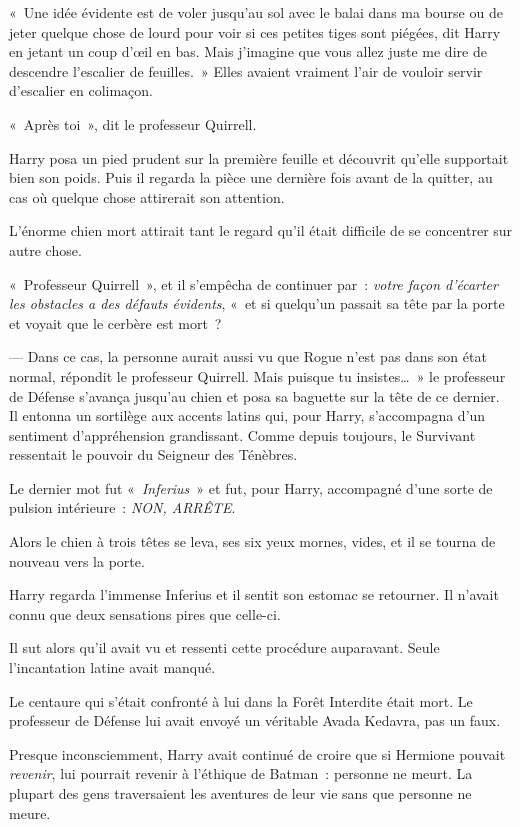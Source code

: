 «~Une idée évidente est de voler jusqu'au sol avec le balai dans ma bourse ou de jeter quelque chose de lourd pour voir si ces petites tiges sont piégées, dit Harry en jetant un coup d'œil en bas.
Mais j'imagine que vous allez juste me dire de descendre l'escalier de feuilles.~»
Elles avaient vraiment l'air de vouloir servir d'escalier en colimaçon.

«~Après toi~», dit le professeur Quirrell.

Harry posa un pied prudent sur la première feuille et découvrit qu'elle supportait bien son poids.
Puis il regarda la pièce une dernière fois avant de la quitter, au cas où quelque chose attirerait son attention.

L'énorme chien mort attirait tant le regard qu'il était difficile de se concentrer sur autre chose.

«~Professeur Quirrell~», et il s'empêcha de continuer par~: \emph{votre façon d'écarter les obstacles a des défauts évidents}, «~et si quelqu'un passait sa tête par la porte et voyait que le cerbère est mort~?

--- Dans ce cas, la personne aurait aussi vu que Rogue n'est pas dans son état normal, répondit le professeur Quirrell.
Mais puisque tu insistes…~»
le professeur de Défense s'avança jusqu'au chien et posa sa baguette sur la tête de ce dernier.
Il entonna un sortilège aux accents latins qui, pour Harry, s'accompagna d'un sentiment d'appréhension grandissant.
Comme depuis toujours, le Survivant ressentait le pouvoir du Seigneur des Ténèbres.

Le dernier mot fut «~\emph{Inferius}~» et fut, pour Harry, accompagné d'une sorte de pulsion intérieure~: \emph{NON, ARRÊTE}.

Alors le chien à trois têtes se leva, ses six yeux mornes, vides, et il se tourna de nouveau vers la porte.

Harry regarda l'immense Inferius et il sentit son estomac se retourner.
Il n'avait connu que deux sensations pires que celle-ci.

Il sut alors qu'il avait vu et ressenti cette procédure auparavant.
Seule l'incantation latine avait manqué.

Le centaure qui s'était confronté à lui dans la Forêt Interdite était mort.
Le professeur de Défense lui avait envoyé un véritable Avada Kedavra, pas un faux.

Presque inconsciemment, Harry avait continué de croire que si Hermione pouvait \emph{revenir}, lui pourrait revenir à l'éthique de Batman~: personne ne meurt.
La plupart des gens traversaient les aventures de leur vie sans que personne ne meure.

